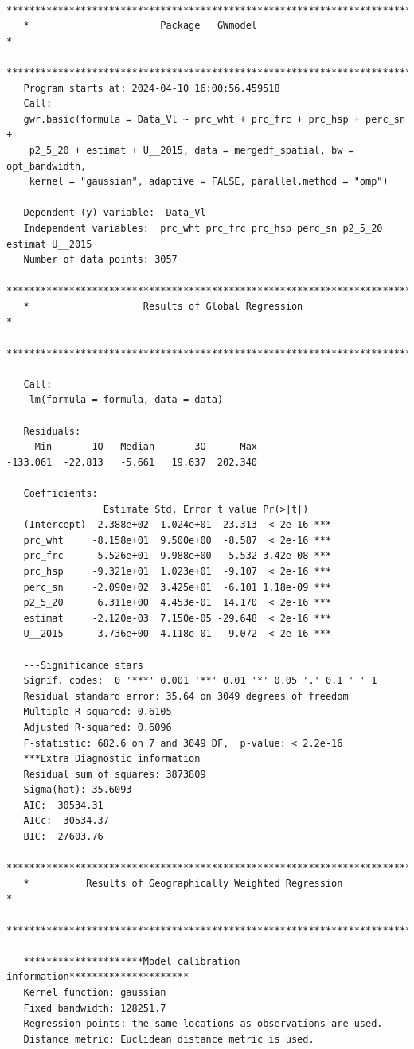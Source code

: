 \documentclass[
]{article}
\begin{document}
\begin{verbatim}
   ***********************************************************************
   *                       Package   GWmodel                             *
   ***********************************************************************
   Program starts at: 2024-04-10 16:00:56.459518 
   Call:
   gwr.basic(formula = Data_Vl ~ prc_wht + prc_frc + prc_hsp + perc_sn + 
    p2_5_20 + estimat + U__2015, data = mergedf_spatial, bw = opt_bandwidth, 
    kernel = "gaussian", adaptive = FALSE, parallel.method = "omp")

   Dependent (y) variable:  Data_Vl
   Independent variables:  prc_wht prc_frc prc_hsp perc_sn p2_5_20 estimat U__2015
   Number of data points: 3057
   ***********************************************************************
   *                    Results of Global Regression                     *
   ***********************************************************************

   Call:
    lm(formula = formula, data = data)

   Residuals:
     Min       1Q   Median       3Q      Max 
-133.061  -22.813   -5.661   19.637  202.340 

   Coefficients:
                 Estimate Std. Error t value Pr(>|t|)    
   (Intercept)  2.388e+02  1.024e+01  23.313  < 2e-16 ***
   prc_wht     -8.158e+01  9.500e+00  -8.587  < 2e-16 ***
   prc_frc      5.526e+01  9.988e+00   5.532 3.42e-08 ***
   prc_hsp     -9.321e+01  1.023e+01  -9.107  < 2e-16 ***
   perc_sn     -2.090e+02  3.425e+01  -6.101 1.18e-09 ***
   p2_5_20      6.311e+00  4.453e-01  14.170  < 2e-16 ***
   estimat     -2.120e-03  7.150e-05 -29.648  < 2e-16 ***
   U__2015      3.736e+00  4.118e-01   9.072  < 2e-16 ***

   ---Significance stars
   Signif. codes:  0 '***' 0.001 '**' 0.01 '*' 0.05 '.' 0.1 ' ' 1 
   Residual standard error: 35.64 on 3049 degrees of freedom
   Multiple R-squared: 0.6105
   Adjusted R-squared: 0.6096 
   F-statistic: 682.6 on 7 and 3049 DF,  p-value: < 2.2e-16 
   ***Extra Diagnostic information
   Residual sum of squares: 3873809
   Sigma(hat): 35.6093
   AIC:  30534.31
   AICc:  30534.37
   BIC:  27603.76
   ***********************************************************************
   *          Results of Geographically Weighted Regression              *
   ***********************************************************************

   *********************Model calibration information*********************
   Kernel function: gaussian 
   Fixed bandwidth: 128251.7 
   Regression points: the same locations as observations are used.
   Distance metric: Euclidean distance metric is used.


\end{verbatim}
\end{document}
